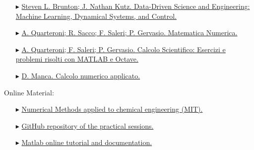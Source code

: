 \documentclass[xcolor={dvipsnames,rgb}, aspectratio=169]{beamer}
\begin{document}
\begin{frame}{}
   \begin{itemize}
      \item[$\blacktriangleright$]
         \href{https://www.amazon.it/Data-Driven-Science-Engineering-Learning-Dynamical/dp/1009098489/ref=asc_df_1009098489/?tag=googshopit-21&linkCode=df0&hvadid=560287860614&hvpos=&hvnetw=g&hvrand=14266207767663986773&hvpone=&hvptwo=&hvqmt=&hvdev=c&hvdvcmdl=&hvlocint=&hvlocphy=1008463&hvtargid=pla-1599460130783&psc=1}{\footnotesize
         Steven L. Brunton; J. Nathan Kutz. Data-Driven Science and Engineering: Machine
         Learning, Dynamical Systems, and Control.}
      \item[$\blacktriangleright$]
         \href{https://link.springer.com/book/10.1007/978-88-470-5644-2}{\footnotesize A.
         Quarteroni; R. Sacco; F. Saleri; P. Gervasio. Matematica Numerica.}
      \item[$\blacktriangleright$]
         \href{https://www.amazon.it/Calcolo-Scientifico-Esercizi-problemi-risolti-dp-8847039525/dp/8847039525/ref=dp_ob_title_bk}{\footnotesize
         A. Quarteroni; F. Saleri; P. Gervasio. Calcolo Scientifico: Esercizi e problemi
         risolti con MATLAB e Octave.}
      \item[$\blacktriangleright$]
         \href{https://www.ibs.it/calcolo-numerico-applicato-libro-davide-manca/e/9788837116972}{\footnotesize
         D. Manca. Calcolo numerico applicato.}
   \end{itemize}
   \small \alert{Online Material}:
      \begin{itemize}
         \item[$\blacktriangleright$]
            \href{https://ocw.mit.edu/courses/10-34-numerical-methods-applied-to-chemical-engineering-fall-2015/pages/syllabus/}{\footnotesize
            Numerical Methods applied to chemical engineering (MIT).}
         \item[$\blacktriangleright$]
            \href{https://github.com/Titodinelli/Calcoli-di-Processo-dell-Ingegneria-Chimica}{\footnotesize
            GitHub repository of the practical sessions.}
         \item[$\blacktriangleright$]
            \href{https://it.mathworks.com/help/matlab/getting-started-with-matlab.html}{\footnotesize
            Matlab online tutorial and documentation.}
    \end{itemize}
\end{frame}
\end{document}
